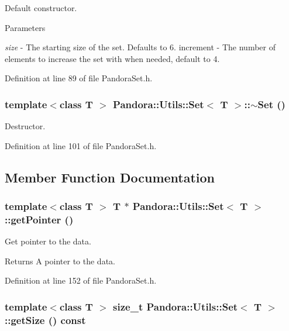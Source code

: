 Default constructor. 
\begin{DoxyParams}{Parameters}
\item[{\em size}]-\/ The starting size of the set. Defaults to 6. increment -\/ The number of elements to increase the set with when needed, default to 4. \end{DoxyParams}


Definition at line 89 of file PandoraSet.h.\hypertarget{classPandora_1_1Utils_1_1Set_a51d05d5d31cb8c16b510262737969f0e}{
\subsubsection[{$\sim$Set}]{\setlength{\rightskip}{0pt plus 5cm}template$<$class T $>$ {\bf Pandora::Utils::Set}$<$ T $>$::$\sim${\bf Set} ()}}
\label{classPandora_1_1Utils_1_1Set_a51d05d5d31cb8c16b510262737969f0e}


Destructor. 

Definition at line 101 of file PandoraSet.h.

\subsection{Member Function Documentation}
\hypertarget{classPandora_1_1Utils_1_1Set_a57d191182540ce79e9a0db1cf52ddd10}{
\subsubsection[{getPointer}]{\setlength{\rightskip}{0pt plus 5cm}template$<$class T $>$ T $\ast$ {\bf Pandora::Utils::Set}$<$ T $>$::getPointer ()}}
\label{classPandora_1_1Utils_1_1Set_a57d191182540ce79e9a0db1cf52ddd10}


Get pointer to the data. \begin{DoxyReturn}{Returns}
A pointer to the data. 
\end{DoxyReturn}


Definition at line 152 of file PandoraSet.h.\hypertarget{classPandora_1_1Utils_1_1Set_a80998fcb33af9bcd8ef6549f107ee1f6}{
\subsubsection[{getSize}]{\setlength{\rightskip}{0pt plus 5cm}template$<$class T $>$ size\_\-t {\bf Pandora::Utils::Set}$<$ T $>$::getSize () const}}
\label{classPandora_1_1Utils_1_1Set_a80998fcb33af9bcd8ef6549f107ee1f6}


